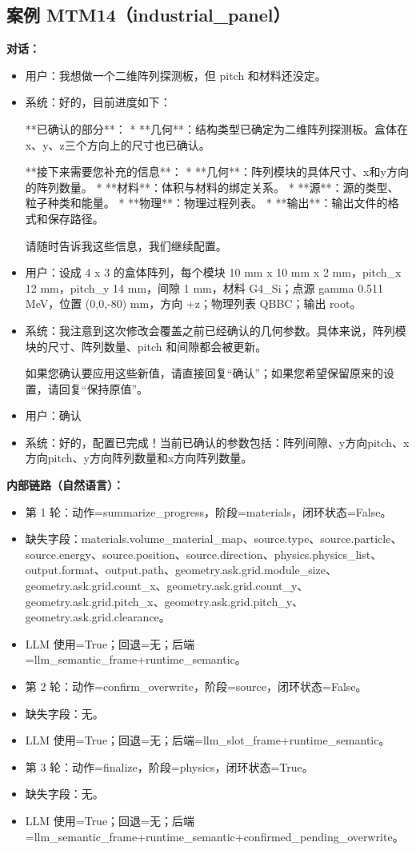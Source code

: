 \documentclass[11pt]{ctexart}
\begin{document}
\subsection{案例 MTM14（industrial\_panel）}
\textbf{对话：}
\begin{itemize}
\item 用户：我想做一个二维阵列探测板，但 pitch 和材料还没定。
\item 系统：好的，目前进度如下：

**已确认的部分**：
*   **几何**：结构类型已确定为二维阵列探测板。盒体在x、y、z三个方向上的尺寸也已确认。

**接下来需要您补充的信息**：
*   **几何**：阵列模块的具体尺寸、x和y方向的阵列数量。
*   **材料**：体积与材料的绑定关系。
*   **源**：源的类型、粒子种类和能量。
*   **物理**：物理过程列表。
*   **输出**：输出文件的格式和保存路径。

请随时告诉我这些信息，我们继续配置。
\item 用户：设成 4 x 3 的盒体阵列，每个模块 10 mm x 10 mm x 2 mm，pitch\_x 12 mm，pitch\_y 14 mm，间隙 1 mm，材料 G4\_Si；点源 gamma 0.511 MeV，位置 (0,0,-80) mm，方向 +z；物理列表 QBBC；输出 root。
\item 系统：我注意到这次修改会覆盖之前已经确认的几何参数。具体来说，阵列模块的尺寸、阵列数量、pitch 和间隙都会被更新。

如果您确认要应用这些新值，请直接回复“确认”；如果您希望保留原来的设置，请回复“保持原值”。
\item 用户：确认
\item 系统：好的，配置已完成！当前已确认的参数包括：阵列间隙、y方向pitch、x方向pitch、y方向阵列数量和x方向阵列数量。
\end{itemize}
\textbf{内部链路（自然语言）：}
\begin{itemize}
\item 第 1 轮：动作=summarize\_progress，阶段=materials，闭环状态=False。
\item 缺失字段：materials.volume\_material\_map、source.type、source.particle、source.energy、source.position、source.direction、physics.physics\_list、output.format、output.path、geometry.ask.grid.module\_size、geometry.ask.grid.count\_x、geometry.ask.grid.count\_y、geometry.ask.grid.pitch\_x、geometry.ask.grid.pitch\_y、geometry.ask.grid.clearance。
\item LLM 使用=True；回退=无；后端=llm\_semantic\_frame+runtime\_semantic。
\item 第 2 轮：动作=confirm\_overwrite，阶段=source，闭环状态=False。
\item 缺失字段：无。
\item LLM 使用=True；回退=无；后端=llm\_slot\_frame+runtime\_semantic。
\item 第 3 轮：动作=finalize，阶段=physics，闭环状态=True。
\item 缺失字段：无。
\item LLM 使用=True；回退=无；后端=llm\_semantic\_frame+runtime\_semantic+confirmed\_pending\_overwrite。
\end{itemize}
\end{document}
